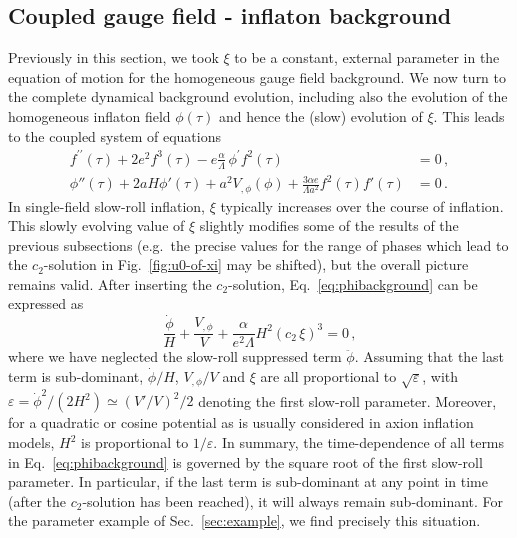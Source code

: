 \subsection{Coupled gauge field - inflaton background \label{subsec:dynamical_background}}

Previously in this section, we took $\xi$ to be a constant, external parameter in the equation of motion for the homogeneous gauge field background. We now turn to the complete dynamical background evolution, including also the evolution of the homogeneous inflaton field $\phi(\tau)$ and hence the (slow) evolution of $\xi$. This leads to the coupled system of equations
\begin{align}
f^{\prime\prime}(\tau)+2e^{2}f^{3}(\tau)-e\frac{\alpha}{\Lambda}\,\phi^{\prime}f^{2}(\tau)\,\  & =0 \,, \label{eq:fbackground2} \\
\phi''(\tau)+2aH\phi'(\tau)+a^{2}V_{,\phi}(\phi)+\frac{3\alpha e}{\Lambda a^{2}}f^{2}(\tau)f'(\tau) & =0 \,.
\label{eq:phibackground}
\end{align}
In single-field slow-roll inflation, $\xi$ typically increases over the course of inflation. This slowly evolving value of $\xi$ slightly modifies some of the results of the previous subsections (e.g.\ the precise values for the range of phases which lead to the $c_2$-solution in Fig.~\ref{fig:u0-of-xi} may be shifted), but the overall picture remains valid. After inserting the $c_2$-solution, Eq.~\eqref{eq:phibackground}  can be expressed as
\begin{equation}
 \frac{\dot \phi}{H} + \frac{V_{,\phi}}{V} +\frac{ \alpha}{e^2 \Lambda} H^2 (c_2 \, \xi)^3 = 0\,,
 \label{eq:phibackground2}
\end{equation}
where we have neglected the slow-roll suppressed term $\ddot \phi$. Assuming that the last term is sub-dominant, $\dot \phi/H$, $V_{,\phi}/V$ and $\xi$ are all proportional to $\sqrt{\varepsilon}$, with $\varepsilon = \dot \phi^2/(2 H^2) \simeq (V'/V)^2/2$ denoting the first slow-roll parameter. Moreover, for a quadratic or cosine potential as is usually considered in axion inflation models, $H^2$ is proportional to $1/\varepsilon$.  In summary, the time-dependence of all terms in Eq.~\eqref{eq:phibackground} is governed by the square root of the first slow-roll parameter. In particular, if the last term is sub-dominant at any point in time (after the $c_2$-solution has been reached), it will always remain sub-dominant. For the parameter example of Sec.~\ref{sec:example}, we find precisely this situation.

